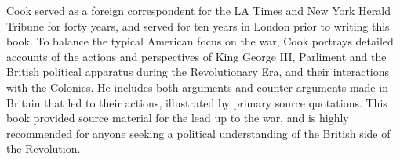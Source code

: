 Cook served as a foreign correspondent for the LA Times and New York Herald
Tribune for forty years, and served for ten years in London prior to writing this
book. To balance the typical American focus on the war, Cook portrays detailed
accounts of the actions and perspectives of King George III, Parliment and the
British political apparatus during the Revolutionary Era, and their interactions
with the Colonies. He includes both arguments and counter arguments made in
Britain that led to their actions, illustrated by primary source quotations.
This book provided source material for the lead up to the war, and is highly
recommended for anyone seeking a political understanding of the British side of
the Revolution.
